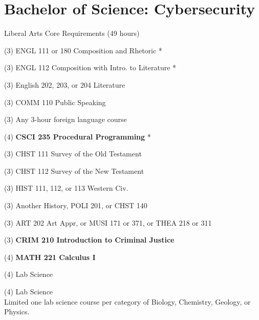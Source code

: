 %
\section*{Bachelor of Science: Cybersecurity}

\begin{reqgroup}{Liberal Arts Core Requirements (49 hours)}
\begin{checklist}
\begin{minipage}[t]{0.5\linewidth}
	\item (3) ENGL 111 or 180 Composition and Rhetoric *
	\item (3) ENGL 112 Composition with Intro\@. to Literature *
	\item (3) English 202, 203, or 204 Literature
	\item (3) COMM 110 Public Speaking
	\item (3) Any 3-hour foreign language course
	\item (4) \textbf{CSCI 235  Procedural Programming} *
	\item (3) CHST 111  Survey of the Old Testament
	\item (3) CHST 112  Survey of the New Testament
	\item (3) HIST 111, 112, or 113 Western Civ.
\end{minipage}
\begin{minipage}[t]{0.5\linewidth}
	\item (3) Another History, POLI 201, or CHST 140
	\item (3) ART 202 Art Appr, or MUSI 171 or 371, or THEA 218 or 311
	\item (3) \textbf{CRIM 210 Introduction to Criminal Justice}
	\item (4) \textbf{MATH 221 Calculus I}
	\item (4) Lab Science
	\item (4) Lab Science\\Limited one lab science course per category of Biology, Chemistry,
Geology, or Physics.
\end{minipage}
\end{checklist}
\end{reqgroup}


